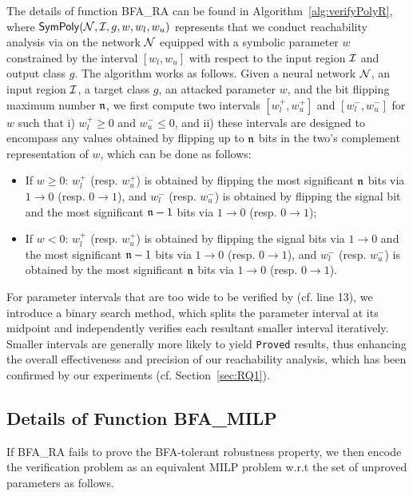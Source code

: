The details of function {\sf BFA\_RA} can be found in Algorithm~\ref{alg:verifyPolyR}, where ${\sf SymPoly}({\mathcal{N}},{\mathcal{I}},g,w, w_l,w_u)$ represents that we conduct reachability analysis via \symPoly on the network ${\mathcal{N}}$ equipped with a symbolic parameter $w$ constrained by the interval $[w_l,w_u]$ with respect to the input region ${\mathcal{I}}$ and output class $g$.
% 
The algorithm works as follows. 
Given a neural network ${\mathcal{N}}$, an input region ${\mathcal{I}}$, a target class $g$, an attacked parameter $w$, and the bit flipping maximum number $\mathfrak{n}$, we first compute two intervals $[w^+_l,w^+_u]$ and $[w^-_l,w^-_u]$ for $w$ such that i) $w^+_l\ge 0$ and $w^-_u\le 0$, and ii) these intervals are designed to encompass any values obtained by flipping up to $\mathfrak{n}$ bits in the two's complement representation of $w$, which can be done as follows: 

\begin{itemize}
    \item If $w\ge 0$: $w^+_l$ (resp. $w^+_u$) is obtained by flipping the most significant $\mathfrak{n}$ bits via $1\rightarrow 0$ (resp. $0\rightarrow 1$), and $w^-_l$ (resp. $w^-_u$) is obtained by flipping the signal bit and the most significant $\mathfrak{n}-1$ bits via $1\rightarrow 0$ (resp. $0\rightarrow 1$);
    \item If $w<0$: $w^+_l$ (resp. $w^+_u$) is obtained by flipping the signal bits via $1\rightarrow 0$ and the most significant $\mathfrak{n}-1$ bits via $1\rightarrow 0$ (resp. $0\rightarrow 1$), and $w^-_l$ (resp. $w^-_u$) is obtained by the most significant $\mathfrak{n}$ bits via $1\rightarrow 0$ (resp. $0\rightarrow 1$).
\end{itemize}

For parameter intervals that are too wide to be verified by \symPoly (cf. line 13), we introduce a binary search method, which splits the parameter interval at its midpoint and independently verifies each resultant smaller interval iteratively. Smaller intervals are generally more likely to yield \texttt{Proved} results, thus enhancing the overall effectiveness and precision of our reachability analysis, which has been confirmed by our experiments (cf. Section~\ref{sec:RQ1}).


\subsection{ Details of Function {\sf BFA\_MILP}}\label{sec:milp}
If {\sf BFA\_RA} fails to prove the BFA-tolerant robustness property, we then encode the verification problem as an equivalent MILP problem w.r.t the set of unproved parameters as follows. 

